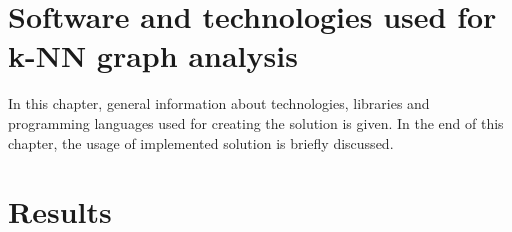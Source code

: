 \documentclass[a4paper,11pt]{article}
\begin{document}

\clearpage
\section{Software and technologies used for k-NN graph analysis}
In this chapter, general information about technologies, libraries and programming languages used for creating the solution is given.
In the end of this chapter, the usage of implemented solution is briefly discussed.



\clearpage
\section{Results}





%


\clearpage
\label{Bibliography} 
%

\footnotesize{  }


%
%
%
\end{document}
